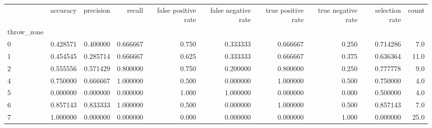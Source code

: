 \begin{tabular}{lrrrrrrrrr}
\toprule
{} &  accuracy &  precision &    recall &  false positive rate &  false negative rate &  true positive rate &  true negative rate &  selection rate &  count \\
throw\_zone &           &            &           &                      &                      &                     &                     &                 &        \\
\midrule
0          &  0.428571 &   0.400000 &  0.666667 &                0.750 &             0.333333 &            0.666667 &               0.250 &        0.714286 &    7.0 \\
1          &  0.454545 &   0.285714 &  0.666667 &                0.625 &             0.333333 &            0.666667 &               0.375 &        0.636364 &   11.0 \\
2          &  0.555556 &   0.571429 &  0.800000 &                0.750 &             0.200000 &            0.800000 &               0.250 &        0.777778 &    9.0 \\
4          &  0.750000 &   0.666667 &  1.000000 &                0.500 &             0.000000 &            1.000000 &               0.500 &        0.750000 &    4.0 \\
5          &  0.000000 &   0.000000 &  0.000000 &                1.000 &             1.000000 &            0.000000 &               0.000 &        0.500000 &    4.0 \\
6          &  0.857143 &   0.833333 &  1.000000 &                0.500 &             0.000000 &            1.000000 &               0.500 &        0.857143 &    7.0 \\
7          &  1.000000 &   0.000000 &  0.000000 &                0.000 &             0.000000 &            0.000000 &               1.000 &        0.000000 &   25.0 \\
\bottomrule
\end{tabular}

